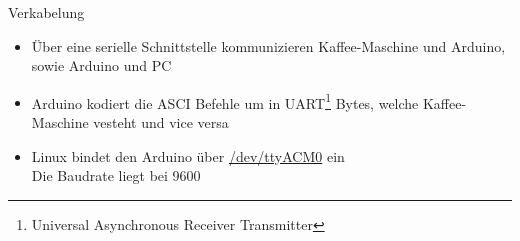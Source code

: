 \documentclass[
  de, %
  inputenc=utf8,
]{tuhhslides}
\begin{document}
\begin{frame}
\begin{center}
  \end{center}
\end{frame}

\begin{frame}{Verkabelung}
  \begin{itemize}
    \item Über eine serielle Schnittstelle kommunizieren Kaffee-Maschine und Arduino, sowie Arduino und PC
    \item Arduino kodiert die ASCI Befehle um in UART\footnote{Universal Asynchronous Receiver Transmitter}  Bytes, welche Kaffee-Maschine vesteht und vice versa
    \item Linux bindet den Arduino über \underline{/dev/ttyACM0} ein \\
          Die Baudrate liegt bei 9600
  \end{itemize}
\end{frame}
\end{document}
